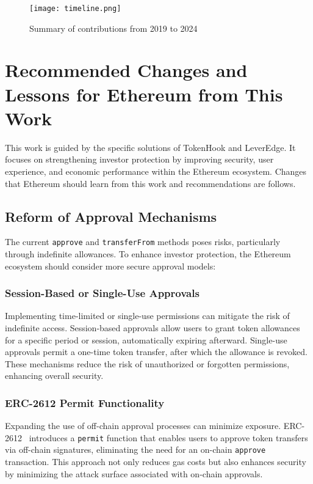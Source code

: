 \begin{figure}[t]
	\centering
	\texttt{[image: timeline.png]}
	\caption[Contributions summary]{Summary of contributions from 2019 to 2024}
	\label{fig:timeline}
\end{figure}

\section{Recommended Changes and Lessons for Ethereum from This Work}
This work is guided by the specific solutions of TokenHook and LeverEdge. It focuses on strengthening investor protection by improving security, user experience, and economic performance within the Ethereum ecosystem. Changes that Ethereum should learn from this work and recommendations are follows.

\subsection{Reform of Approval Mechanisms}
The current \texttt{approve} and \texttt{transferFrom} methods poses risks, particularly through indefinite allowances. To enhance investor protection, the Ethereum ecosystem should consider more secure approval models:

\subsubsection{Session-Based or Single-Use Approvals}
Implementing time-limited or single-use permissions can mitigate the risk of indefinite access. Session-based approvals allow users to grant token allowances for a specific period or session, automatically expiring afterward. Single-use approvals permit a one-time token transfer, after which the allowance is revoked. These mechanisms reduce the risk of unauthorized or forgotten permissions, enhancing overall security.

\subsubsection{ERC-2612 Permit Functionality}
Expanding the use of off-chain approval processes can minimize exposure. ERC-2612~\cite{eip2612} introduces a \texttt{permit} function that enables users to approve token transfers via off-chain signatures, eliminating the need for an on-chain \texttt{approve} transaction. This approach not only reduces gas costs but also enhances security by minimizing the attack surface associated with on-chain approvals.

